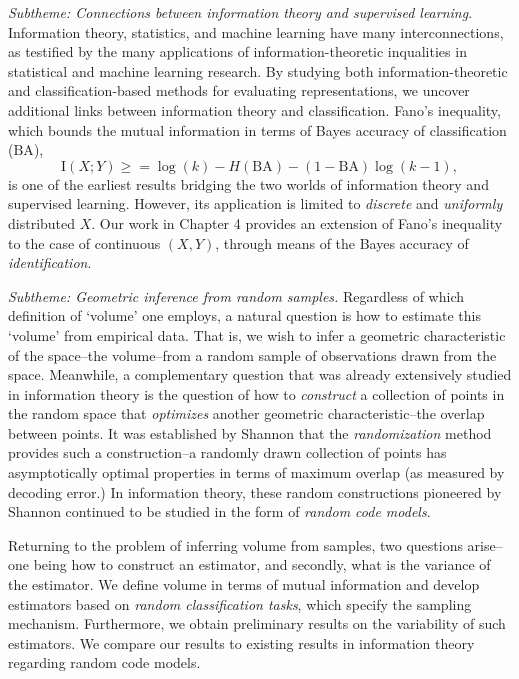 \emph{Subtheme: Connections between information theory and supervised
  learning}.  Information theory, statistics, and machine learning
have many interconnections, as testified by the many applications of
information-theoretic inqualities in statistical and machine learning
research.  By studying both information-theoretic and
classification-based methods for evaluating representations, we
uncover additional links between information theory and
classification.  Fano's inequality, which bounds the mutual
information in terms of Bayes accuracy of classification
($\text{BA}$),
\[
\text{I}(X; Y) \geq = \log(k)-H(\text{BA}) - (1-\text{BA})\log(k-1),
\] 
is one of the earliest results bridging the two worlds of information
theory and supervised learning.  However, its application is limited
to \emph{discrete} and \emph{uniformly} distributed $X$.  Our work in
Chapter 4 provides an extension of Fano's inequality to the case of
continuous $(X, Y)$, through means of the Bayes accuracy of
\emph{identification}.

\emph{Subtheme: Geometric inference from random samples.}  Regardless
of which definition of `volume' one employs, a natural question is how
to estimate this `volume' from empirical data.  That is, we wish to
infer a geometric characteristic of the space--the volume--from a
random sample of observations drawn from the space.  Meanwhile, a
complementary question that was already extensively studied in
information theory is the question of how to \emph{construct} a
collection of points in the random space that \emph{optimizes} another
geometric characteristic--the overlap between points.  It was
established by Shannon that the \emph{randomization} method provides
such a construction--a randomly drawn collection of points has
asymptotically optimal properties in terms of maximum overlap (as
measured by decoding error.)  In information theory, these random
constructions pioneered by Shannon continued to be studied in the form
of \emph{random code models}.

Returning to the problem of inferring volume from samples, two
questions arise--one being how to construct an estimator, and
secondly, what is the variance of the estimator.  We define volume in
terms of mutual information and develop estimators based on
\emph{random classification tasks}, which specify the sampling
mechanism.  Furthermore, we obtain preliminary results on the
variability of such estimators.  We compare our results to existing
results in information theory regarding random code models.


